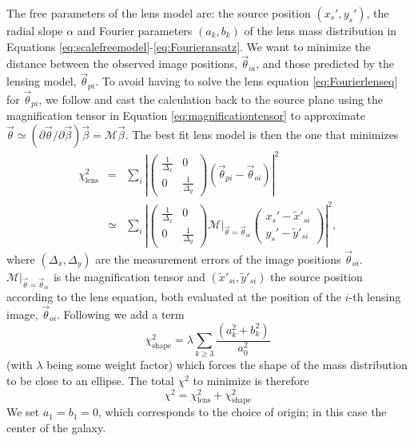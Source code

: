 \documentclass[useAMS,usenatbib]{mnras}
\newcommand{\vect}[1]{\vec{#1}} %
\begin{document}
The free parameters of the lens model are: the source position $(x_s',y_s')$, the radial slope $\alpha$ and Fourier parameters $(a_k,b_k)$ of the lens mass distribution in Equations \eqref{eq:scalefreemodel}-\eqref{eq:Fourieransatz}. We want to minimize the distance between the observed image positions, $\vect{\theta}_{oi}$, and those predicted by the lensing model, $\vect{\theta}_{pi}$. To avoid having to solve the lens equation \eqref{eq:Fourierlenseq} for $\vect{\theta}_{pi}$, we follow \citet{1991ApJ...373..354K} and cast the calculation back to the source plane using the magnification tensor in Equation \eqref{eq:magnificationtensor} to approximate $\vect{\theta} \simeq (\partial \vect{\theta} / \partial \vect{\beta}) \vect{\beta} = \mathscr{M} \vect{\beta} $. The best fit lens model is then the one that minimizes
\begin{eqnarray}
\chi^2_\text{lens} &=& \sum_{i} \left|\left( \begin{matrix} \frac{1}{\Delta_x} & 0\\0 & \frac{1}{\Delta_y}\end{matrix}\right) \left( \vect{\theta}_{pi} - \vect{\theta}_{oi} \right)\right|^2\nonumber\\
&\simeq& \sum_{i} \left|\left( \begin{matrix} \frac{1}{\Delta_x} & 0\\0 & \frac{1}{\Delta_y}\end{matrix}\right)  \left.\mathscr{M}\right|_{\vect{\theta}=\vect{\theta}_{oi}} \left( \begin{matrix} x_s' - \tilde{x}'_{si} \\ y_s' - \tilde{y}'_{si} \end{matrix} \right) \right|^2,\label{eq:chi2lens}
\end{eqnarray}
where $(\Delta_x,\Delta_y)$ are the measurement errors of the image positions $\vect{\theta}_{oi}$. $\left.\mathscr{M}\right|_{\vect{\theta}=\vect{\theta}_{oi}}$ is the magnification tensor and $(\tilde{x}'_{si},\tilde{y}'_{si})$ the source position according to the lens equation, both evaluated at the position of the $i$-th lensing image, $\vect{\theta}_{oi}$. Following \citet{GlennEC} we add a term
\begin{equation}
\chi^2_\text{shape} = \lambda \sum_{k \geq 3} \frac{\left(a_k^2 +b_k^2 \right)}{a_0^2} \label{eq:chi2shape}
\end{equation}
(with $\lambda$ being some weight factor) which forces the shape of the mass distribution to be close to an ellipse. The total $\chi^2$ to minimize is therefore
\begin{equation}
\chi^2 = \chi^2_\text{lens} + \chi^2_\text{shape} \label{eq:chi2total}
\end{equation}
We set $a_1 = b_1 = 0$, which corresponds to the choice of origin; in this case the center of the galaxy.
\end{document}
